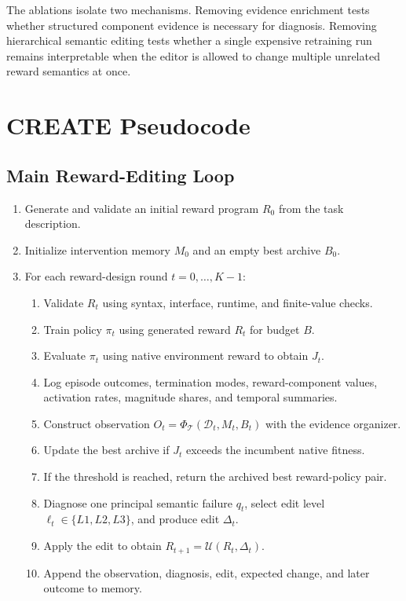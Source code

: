 \documentclass[10pt]{article}
\begin{document}
The ablations isolate two mechanisms. Removing evidence enrichment tests whether structured component evidence is necessary for diagnosis. Removing hierarchical semantic editing tests whether a single expensive retraining run remains interpretable when the editor is allowed to change multiple unrelated reward semantics at once.

\section{CREATE Pseudocode}

\subsection{Main Reward-Editing Loop}

\begin{enumerate}
    \item Generate and validate an initial reward program $R_0$ from the task description.
    \item Initialize intervention memory $M_0$ and an empty best archive $B_0$.
    \item For each reward-design round $t=0,\dots,K-1$:
    \begin{enumerate}
        \item Validate $R_t$ using syntax, interface, runtime, and finite-value checks.
        \item Train policy $\pi_t$ using generated reward $R_t$ for budget $B$.
        \item Evaluate $\pi_t$ using native environment reward to obtain $J_t$.
        \item Log episode outcomes, termination modes, reward-component values, activation rates, magnitude shares, and temporal summaries.
        \item Construct observation $O_t=\Phi_{\mathcal T}(\mathcal D_t,M_t,B_t)$ with the evidence organizer.
        \item Update the best archive if $J_t$ exceeds the incumbent native fitness.
        \item If the threshold is reached, return the archived best reward-policy pair.
        \item Diagnose one principal semantic failure $q_t$, select edit level $\ell_t\in\{L1,L2,L3\}$, and produce edit $\Delta_t$.
        \item Apply the edit to obtain $R_{t+1}=\mathcal U(R_t,\Delta_t)$.
        \item Append the observation, diagnosis, edit, expected change, and later outcome to memory.
    \end{enumerate}
\end{enumerate}
\end{document}
